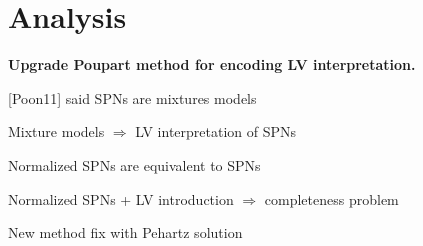 \section{Analysis}


{\bf Upgrade Poupart method for encoding LV interpretation.}

[Poon11] said SPNs are mixtures models

Mixture models $\Rightarrow$ LV interpretation of SPNs

Normalized SPNs are equivalent to SPNs

Normalized SPNs + LV introduction $\Rightarrow$ completeness problem

New method fix with Pehartz solution
